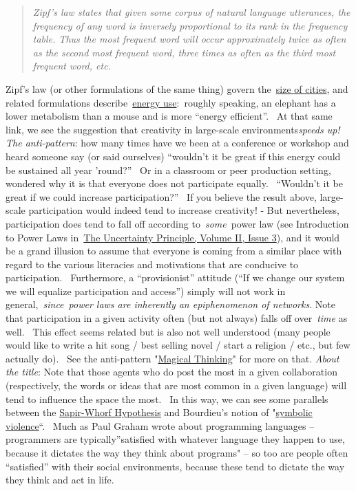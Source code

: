 \begin{quote}
\emph{Zipf's law states that given some corpus of natural language
utterances, the frequency of any word is inversely proportional to its
rank in the frequency table. Thus the most frequent word will occur
approximately twice as often as the second most frequent word, three
times as often as the third most frequent word, etc.}
\end{quote}

Zipf's law (or other formulations of the same thing) govern
the~\href{http://www2.econ.uu.nl/users/marrewijk/geography/zipf/index.htm}{size
of cities}, and related formulations
describe~\href{http://pricetags.wordpress.com/2010/10/26/kleibers-law-growth-and-creativity-in-cities/}{energy
use}:~roughly speaking, an elephant has a lower metabolism than a mouse
and is more ``energy efficient''. ~At that same link, we see the
suggestion that creativity in large-scale environments\emph{speeds up!}
\emph{The anti-pattern}: how many times have we been at a conference or
workshop and heard someone say (or said ourselves) ``wouldn't it be
great if this energy could be sustained all year 'round?'' ~Or in a
classroom or peer production setting, wondered why it is that everyone
does not participate equally. ~``Wouldn't it be great if we could
increase participation?'' ~If you believe the result above, large-scale
participation would indeed tend to increase creativity! - But
nevertheless, participation does tend to fall off according
to~\emph{some}~power law (see Introduction to Power Laws
in~\href{http://www.theuncertaintyprinciple.danoff.org/v2i3.html}{The
Uncertainty Principle, Volume II, Issue 3}), and it would be a grand
illusion to assume that everyone is coming from a similar place with
regard to the various literacies and motivations that are conducive to
participation. ~Furthermore, a ``provisionist'' attitude (``If we change
our system we will equalize participation and access'') simply will not
work in general,~\emph{since}~\emph{power laws are inherently an
epiphenomenon of networks}. Note that participation in a given activity
often (but not always) falls off over~\emph{time} as well.~ This effect
seems related but is also not well understood (many people would like to
write a hit song / best selling novel / start a religion / etc., but few
actually do).~ See the anti-pattern
"\href{http://peeragogy.org/antipatterns/magical-thinking/}{Magical
Thinking}" for more on that. \emph{About the title}: Note that those
agents who do post the most in a given collaboration (respectively, the
words or ideas that are most common in a given language) will tend to
influence the space the most.~ In this way, we can see some parallels
between the
\href{http://en.wikipedia.org/wiki/Linguistic\_relativity}{Sapir-Whorf
Hypothesis} and Bourdieu's notion of
"\href{http://en.wikipedia.org/wiki/Symbolic\_violence}{symbolic
violence}``.~ Much as Paul Graham wrote about programming languages --
programmers are typically''satisfied with whatever language they happen
to use, because it dictates the way they think about programs" -- so too
are people often ``satisfied'' with their social environments, because
these tend to dictate the way they think and act in life.
